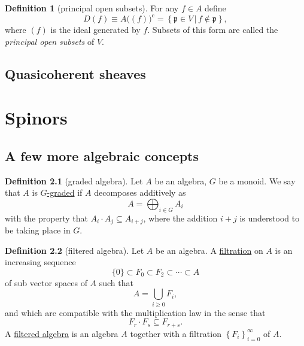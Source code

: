 \documentclass[a4paper,10pt]{scrreprt}
\newcommand{\defn}[1]{\ul{#1}}
\theoremstyle{definition}
\newtheorem{definition}{Definition}[section]
\theoremstyle{plain}
\theoremstyle{remark}
\begin{document}
\begin{definition}[principal open subsets]
  \label{def:principalopensubsets}
  For any $f \in A$ define 
  \begin{equation*}
    D(f) \equiv A\big((f)\big)^{\mathrm{c}} = \left\{ \mathfrak{p} \in V\,\big|\, f \notin \mathfrak{p} \right\},
  \end{equation*}
  where $(f)$ is the ideal generated by $f$. Subsets of this form are called the \emph{principal open subsets} of $V$.
\end{definition}



\section{Quasicoherent sheaves} \label{sec:quasicoherentsheaves}

\chapter{Spinors} 
\section{A few more algebraic concepts}
\begin{definition}[graded algebra]
  \label{def:gradedalgebra}
  Let $A$ be an algebra, $G$ be a monoid. We say that $A$ is \defn{$G$-graded} if $A$ decomposes additively as  \begin{equation*}
    A = \bigoplus_{i \in G} A_{i}
  \end{equation*}
  with the property that $A_{i} \cdot A_{j} \subseteq A_{i+j}$, where the addition $i+j$ is understood to be taking place in $G$.
\end{definition}

\begin{definition}[filtered algebra]
  \label{def:filteredalgebra}
  Let $A$ be an algebra. A \defn{filtration} on $A$ is an increasing sequence 
  \begin{equation*}
    \{0\} \subset F_{0} \subset F_{2} \subset \cdots \subset A
  \end{equation*}
  of sub vector spaces of $A$ such that
  \begin{equation*}
    A = \bigcup_{i\geq 0} F_{i},
  \end{equation*}
  and which are compatible with the multiplication law in the sense that
  \begin{equation*}
    F_{r} \cdot F_{s} \subseteq F_{r+s}.
  \end{equation*}
  A \defn{filtered algebra} is an algebra $A$ together with a filtration $\left\{ F_{i} \right\}_{i=0}^{\infty}$ of $A$.
\end{definition}
\end{document}
